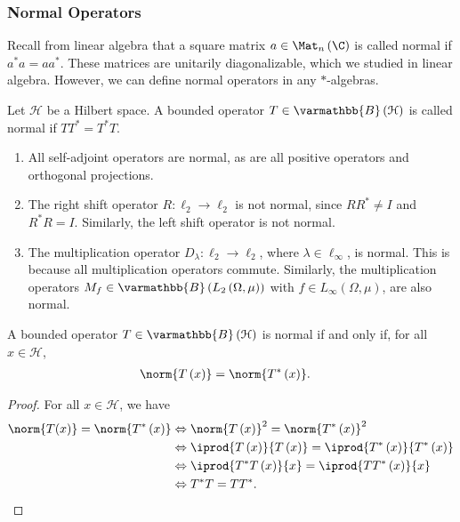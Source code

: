 \documentclass[10pt]{mypackage}
\renewcommand*{\mathbb}[1]{\varmathbb{#1}}
\newcommand{\B}{\mathbb{B}}
\begin{document}
\subsubsection{Normal Operators}%
Recall from linear algebra that a square matrix $a\in \Mat_{n}\left(\C\right)$ is called normal if $a^{\ast}a = aa^{\ast}$. These matrices are unitarily diagonalizable, which we studied in linear algebra. However, we can define normal operators in any $\ast$-algebras.
\begin{definition}
  Let $\mathcal{H}$ be a Hilbert space. A bounded operator $T\in \B\left(\mathcal{H}\right)$ is called normal if $TT^{\ast} = T^{\ast}T$.
\end{definition}
\begin{example}\hfill
  \begin{enumerate}[(1)]
    \item All self-adjoint operators are normal, as are all positive operators and orthogonal projections.
    \item The right shift operator $R: \ell_2\rightarrow \ell_2$ is not normal, since $RR^{\ast} \neq I$ and $R^{\ast}R = I$. Similarly, the left shift operator is not normal.
    \item The multiplication operator $D_{\lambda}:\ell_2\rightarrow \ell_2$, where $\lambda \in \ell_{\infty}$, is normal. This is because all multiplication operators commute. Similarly, the multiplication operators $M_{f}\in \B\left(L_{2}\left(\Omega,\mu\right)\right)$ with $f\in L_{\infty}\left(\Omega,\mu\right)$, are also normal.
  \end{enumerate}
\end{example}
\begin{lemma}
  A bounded operator $T\in \B\left(\mathcal{H}\right)$ is normal if and only if, for all $x\in \mathcal{H}$,
  \begin{align*}
    \norm{T\left(x\right)} &= \norm{T^{\ast}\left(x\right)}.
  \end{align*}
\end{lemma}
\begin{proof}
  For all $x\in \mathcal{H}$, we have
  \begin{align*}
    \norm{T(x)} = \norm{T^{\ast}\left(x\right)} &\Leftrightarrow \norm{T\left(x\right)}^2 = \norm{T^{\ast}\left(x\right)}^2\\
                                                &\Leftrightarrow \iprod{T\left(x\right)}{T\left(x\right)} = \iprod{T^{\ast}\left(x\right)}{T^{\ast}\left(x\right)}\\
                                                &\Leftrightarrow \iprod{T^{\ast}T\left(x\right)}{x} = \iprod{TT^{\ast}\left(x\right)}{x}\\
                                                &\Leftrightarrow T^{\ast}T = TT^{\ast}.
  \end{align*}
\end{proof}
\end{document}
